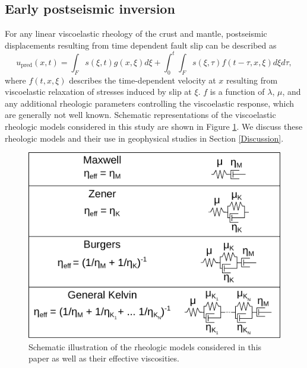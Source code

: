 \subsection{Early postseismic inversion}\label{ch3:sec:InitialInversion}
For any linear viscoelastic rheology of the crust and mantle,
postseismic displacements resulting from time dependent fault slip can
be described as
\begin{equation}\label{GeneralForward}
  u_\mathrm{pred}(x,t) = \int_F s(\xi,t)g(x,\xi)d\xi + 
           \int_0^t\int_F s(\xi,\tau) f(t-\tau,x,\xi) d\xi d\tau,
\end{equation}
where $f(t,x,\xi)$ describes the time-dependent velocity at $x$
resulting from viscoelastic relaxation of stresses induced by slip at
$\xi$. $f$ is a function of $\lambda$, $\mu$, and any additional
rheologic parameters controlling the viscoelastic response, which are
generally not well known. Schematic representations of the
viscoelastic rheologic models considered in this study are shown in
Figure \ref{ch3:fig:Rheology}.  We discuss these rheologic models and
their use in geophysical studies in Section \ref{Discussion}.

\begin{figure}
\includegraphics[scale=1.0]{ch3/figures/2016jb013114-f08}
\caption{Schematic illustration of the rheologic models considered in
this paper as well as their effective viscosities.}
\label{ch3:fig:Rheology}
\end{figure}

